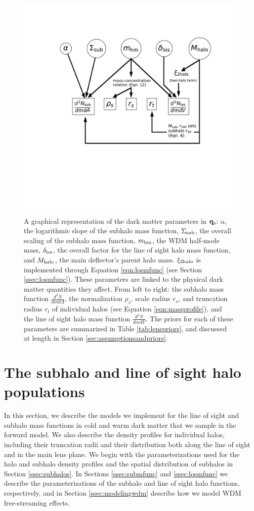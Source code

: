 \begin{figure}
	\includegraphics[clip,trim=3.8cm 8cm 2.5cm
	4cm,width=.8\textwidth,keepaspectratio]{./figures_wdmchillsout/schematic.pdf}
	\caption{\label{fig:schematic} A graphical representation of the dark matter parameters in ${\bf{q}_{\rm{s}}}$: $\alpha$, the logarithmic slope of the subhalo mass function, $\Sigma_{\rm{sub}}$, the overall scaling of the subhalo mass function, ${m_{\rm{hm}}}$, the WDM half-mode mass, $\delta_{\rm{los}}$, the overall factor for the  line of sight halo mass function, and $M_{\rm{halo}}$, the main deflector's parent halo mass. $\xi_{\rm{2halo}}$ is implemented through Equation \ref{eqn:losmfunc} (see Section \ref{ssec:losmfunc}). These parameters are linked to the physical dark matter quantities they affect. From left to right: the subhalo mass function $\frac{d^2 N}{dm dA}$, the normalization $\rho_s$, scale radius $r_s$, and truncation radius $r_t$ of individual halos (see Equation \ref{eqn:massprofile}), and the line of sight halo mass function $\frac{d^2 N}{dm dV}$. The priors for each of these parameters are summarized in Table \ref{tab:lenspriors}, and discussed at length in Section \ref{sec:assumptionsandpriors}.}
\end{figure}	

\section{The subhalo and line of sight halo populations}
\label{sec:parameterizations}
In this section, we describe the models we implement for the line of sight and subhalo mass functions in cold and warm dark matter that we sample in the forward model. We also describe the density profiles for individual halos, including their truncation radii and their distribution both along the line of sight and in the main lens plane. We begin with the parameterizations used for the halo and subhalo density profiles and the spatial distribution of subhalos in Section \ref{ssec:subhalos}. In Sections \ref{ssec:submfunc} and \ref{ssec:losmfunc} we describe the parameterizations of the subhalo and line of sight halo functions, respectively, and in Section \ref{ssec:modelingwdm} describe how we model WDM free-streaming effects. 

